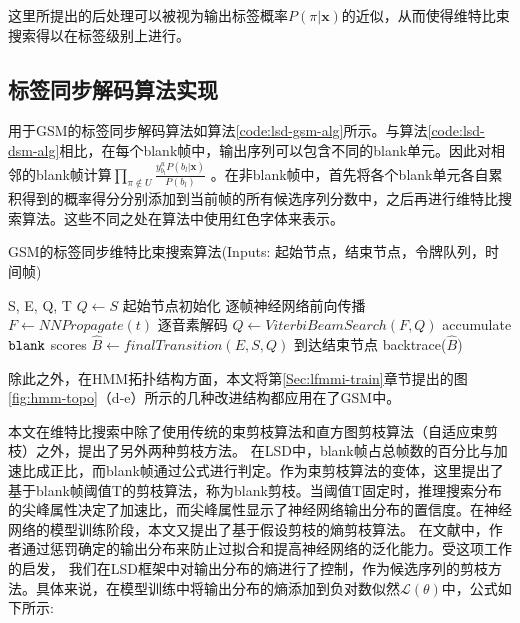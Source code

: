 这里所提出的后处理可以被视为输出标签概率$P(\pi|\mathbf{x})$的近似，从而使得维特比束搜索得以在标签级别上进行。


\subsection{标签同步解码算法实现}
\label{chap:lsd-lsd-hmm-alg}

用于GSM的标签同步解码算法如算法\ref{code:lsd-gsm-alg}所示。与算法\ref{code:lsd-dsm-alg}相比，在每个blank帧中，输出序列可以包含不同的blank单元。因此对相邻的blank帧计算$\prod_{\pi\not\in U}\frac{y_{b_l}^u P(b_l|\mathbf{x})}{P(b_l)}$ 。在非blank帧中，首先将各个blank单元各自累积得到的概率得分分别添加到当前帧的所有候选序列分数中，之后再进行维特比搜索算法。这些不同之处在算法中使用红色字体来表示。


\begin{algorithm}[ht]
\caption{GSM的标签同步维特比束搜索算法\textcolor[rgb]{0,0.5,0}{(Inputs: 起始节点，结束节点，令牌队列，时间帧)}}
\label{code:lsd-gsm-alg}
\begin{algorithmic}[1]
 {S, E, Q, T}
\State $Q \leftarrow S$ \Comment \textcolor[rgb]{0,0.5,0}{起始节点初始化}
    \Comment \textcolor[rgb]{0,0.5,0}{逐帧神经网络前向传播}
\State $F \leftarrow NNPropagate(t)$
    \Comment \textcolor[rgb]{0,0.5,0}{逐音素解码}
\State  {\color{red}{$F \leftarrow addAccumulatedBlankScore(V,F)$ }}
\State  {\color{red}{$reset(V)$ }}
\State  $Q\leftarrow ViterbiBeamSearch(F, Q)$
\Else         \Comment \textcolor[rgb]{0,0.5,0}{accumulate $\tt blank$ scores}
\State  {\color{red}{$V \leftarrow accumulateBlankScore(V,F)$ }}
\EndIf
\EndFor
\State $\hat B\leftarrow finalTransition(E,S,Q)$ \Comment \textcolor[rgb]{0,0.5,0}{到达结束节点}
\State backtrace($\hat B$)
\EndProcedure
\end{algorithmic}
\end{algorithm}


除此之外，在HMM拓扑结构方面，本文将第\ref{Sec:lfmmi-train}章节提出的图\ref{fig:hmm-topo}（d-e）所示的几种改进结构都应用在了GSM中。

本文在维特比搜索中除了使用传统的束剪枝算法\cite{forney1973viterbi}和直方图剪枝算法\cite{steinbiss1994improvements}（自适应束剪枝\cite{van1996adaptive}）之外，提出了另外两种剪枝方法。 在LSD中，blank帧占总帧数的百分比与加速比成正比，而blank帧通过公式进行判定。作为束剪枝算法的变体，这里提出了基于blank帧阈值T的剪枝算法，称为blank剪枝。当阈值T固定时，推理搜索分布的尖峰属性决定了加速比，而尖峰属性显示了神经网络输出分布的置信度。在神经网络的模型训练阶段，本文又提出了基于假设剪枝的熵剪枝算法。 在文献\cite{pereyra2017regularizing}中，作者通过惩罚确定的输出分布来防止过拟合和提高神经网络的泛化能力。受这项工作的启发， 我们在LSD框架中对输出分布的熵进行了控制，作为候选序列的剪枝方法。具体来说，在模型训练中将输出分布的熵添加到负对数似然$\mathcal{L}(\theta)$中，公式如下所示:
  
